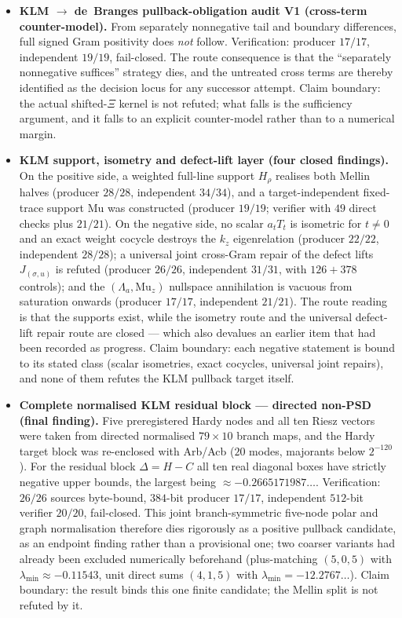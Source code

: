 \documentclass[12pt,a4paper]{article}
\theoremstyle{definition}
\theoremstyle{remark}
\begin{document}
\begin{itemize}
  \item \textbf{KLM $\to$ de~Branges pullback-obligation audit V1
    (cross-term counter-model).} From separately nonnegative tail and
    boundary differences, full signed Gram positivity does \emph{not}
    follow. Verification: producer $17/17$, independent $19/19$,
    fail-closed. The route consequence is that the ``separately nonnegative
    suffices'' strategy dies, and the untreated cross terms are thereby
    identified as the decision locus for any successor attempt. Claim
    boundary: the actual shifted-$\Xi$ kernel is not refuted; what falls is
    the sufficiency argument, and it falls to an explicit counter-model
    rather than to a numerical margin.

  \item \textbf{KLM support, isometry and defect-lift layer (four closed
    findings).} On the positive side, a weighted full-line support $H_\rho$
    realises both Mellin halves (producer $28/28$, independent $34/34$),
    and a target-independent fixed-trace support $\mathrm{Mu}$ was
    constructed (producer $19/19$; verifier with $49$ direct checks plus
    $21/21$). On the negative side, no scalar $a_t T_t$ is isometric for
    $t \neq 0$ and an exact weight cocycle destroys the $k_z$ eigenrelation
    (producer $22/22$, independent $28/28$); a universal joint cross-Gram
    repair of the defect lifts $J_{(\sigma,u)}$ is refuted (producer
    $26/26$, independent $31/31$, with $126+378$ controls); and the
    $(\Lambda_a, \mathrm{Mu}_z)$ nullspace annihilation is vacuous from
    saturation onwards (producer $17/17$, independent $21/21$). The route
    reading is that the supports exist, while the isometry route and the
    universal defect-lift repair route are closed --- which also devalues
    an earlier item that had been recorded as progress. Claim boundary:
    each negative statement is bound to its stated class (scalar
    isometries, exact cocycles, universal joint repairs), and none of them
    refutes the KLM pullback target itself.

  \item \textbf{Complete normalised KLM residual block --- directed
    non-PSD (final finding).} Five preregistered Hardy nodes and all ten
    Riesz vectors were taken from directed normalised $79\times 10$ branch
    maps, and the Hardy target block was re-enclosed with Arb/Acb ($20$
    modes, majorants below $2^{-120}$). For the residual block
    $\Delta = H - C$ all ten real diagonal boxes have strictly negative
    upper bounds, the largest being $\approx -0.2665171987\ldots$.
    Verification: $26/26$ sources byte-bound, $384$-bit producer $17/17$,
    independent $512$-bit verifier $20/20$, fail-closed. This joint
    branch-symmetric five-node polar and graph normalisation therefore dies
    rigorously as a positive pullback candidate, as an endpoint finding
    rather than a provisional one; two coarser variants had already been
    excluded numerically beforehand (plus-matching $(5,0,5)$ with
    $\lambda_{\min} \approx -0.11543$, unit direct sums $(4,1,5)$ with
    $\lambda_{\min} = -12.2767\ldots$). Claim boundary: the result binds
    this one finite candidate; the Mellin split is not refuted by it.


\end{itemize}
\end{document}
